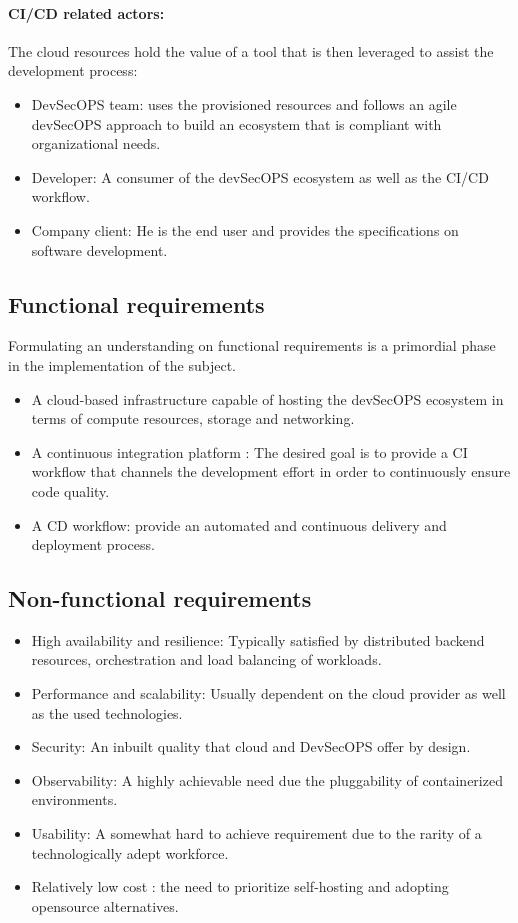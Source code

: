 \paragraph{CI/CD related actors:}
The cloud resources hold the value of a tool that is then leveraged to assist the development process:
\begin{itemize}[label={--}]
\item DevSecOPS team: uses the provisioned resources and follows an agile devSecOPS approach to build an ecosystem that is compliant with organizational needs.
\item Developer: A consumer of the devSecOPS ecosystem as well as the CI/CD workflow.
\item Company client: He is the end user and provides the specifications on software development.
\end{itemize}

\subsection{Functional requirements}

Formulating an understanding on functional requirements is a primordial phase in the implementation of the subject.

\begin{itemize}[label={--}]
\item A cloud-based infrastructure capable of hosting the devSecOPS ecosystem in terms of compute resources, storage and networking.
\item A continuous integration platform : The desired goal is to provide a CI workflow that channels the development effort in order to continuously ensure code quality.
\item A CD workflow: provide an automated and continuous delivery and deployment process.
\end{itemize}

\subsection{Non-functional requirements}

\begin{itemize}[label={--}]
\item High availability and resilience: Typically satisfied by distributed backend resources, orchestration and load balancing of workloads. 
\item Performance and scalability: Usually dependent on the cloud provider as well as the used technologies.
\item Security: An inbuilt quality that cloud and DevSecOPS offer by design.
\item Observability: A highly achievable need due the pluggability of containerized environments.
\item Usability: A somewhat hard to achieve requirement due to the rarity of a technologically adept workforce. 
\item Relatively low cost : the need to prioritize self-hosting and adopting opensource alternatives.
\end{itemize}


